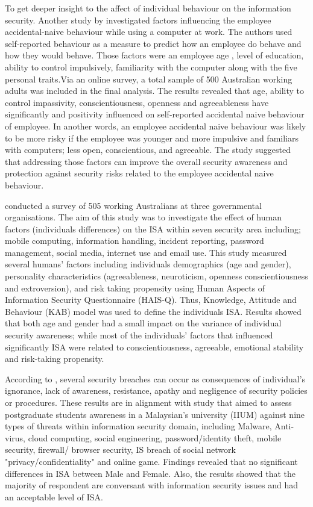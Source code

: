To get deeper insight to the affect of individual behaviour on the information security. Another study by \cite{Parsons2014} investigated factors influencing the employee accidental-naive behaviour while using a computer at work. The authors used self-reported behaviour as a measure to predict how an employee do behave and how they would behave. Those factors were an employee age , level of education, ability to control impulsively, familiarity with the computer along with the five personal traits.Via an online survey, a total sample of 500 Australian working adults was included in the final analysis. The results revealed that age, ability to control impassivity, conscientiousness, openness  and agreeableness have significantly and positivity influenced on self-reported accidental naive behaviour of employee. In another words, an employee accidental naive behaviour was likely to be more risky if the employee was younger and more impulsive and familiars with computers; less open, conscientious, and agreeable. The study suggested that addressing those factors can improve the overall security awareness and protection against  security risks related to the employee accidental naive behaviour.   
  
\citet{McCormac2016} conducted a survey of 505 working Australians at three governmental organisations. The aim of this study was to investigate the effect of human factors (individuals differences) on the ISA within seven security area including; mobile computing, information handling, incident reporting, password management, social media, internet use and email use. This study measured several humans' factors including individuals demographics (age and gender), personality characteristics (agreeableness, neuroticism, openness conscientiousness and extroversion), and risk taking propensity using Human Aspects of Information Security Questionnaire (HAIS-Q). Thus, Knowledge, Attitude and Behaviour (KAB) model was used to define the individuals ISA. Results showed that both age and gender had a small impact on the variance of individual security awareness; while most of the individuals' factors that  influenced significantly ISA were related to conscientiousness, agreeable, emotional stability and risk-taking propensity.

According to \citet{safa2015information}, several security breaches can occur as consequences of individual's ignorance, lack of awareness, resistance, apathy and negligence of security policies or procedures. 
These results are in alignment with  \citet{Hamid2014} study that aimed to assess postgraduate students awareness in a Malaysian's university (IIUM) against nine types of threats within information security domain, including Malware, Anti-virus, cloud computing, social engineering, password/identity theft, mobile security, firewall/ browser security, IS breach of social network "privacy/confidentiality" and online game. Findings revealed that no significant differences in ISA between Male and Female. Also, the results showed that the majority of respondent are conversant with information security issues and had an acceptable level of ISA. 

